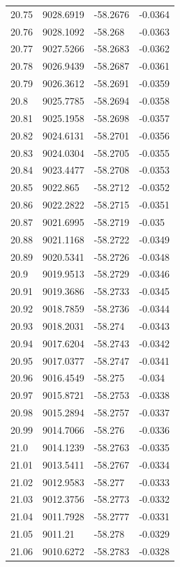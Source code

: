 \begin{table}[H]
\begin{tabular}{llll}
20.75 & 9028.6919 & -58.2676 & -0.0364 \\
20.76 & 9028.1092 & -58.268 & -0.0363 \\
20.77 & 9027.5266 & -58.2683 & -0.0362 \\
20.78 & 9026.9439 & -58.2687 & -0.0361 \\
20.79 & 9026.3612 & -58.2691 & -0.0359 \\
20.8 & 9025.7785 & -58.2694 & -0.0358 \\
20.81 & 9025.1958 & -58.2698 & -0.0357 \\
20.82 & 9024.6131 & -58.2701 & -0.0356 \\
20.83 & 9024.0304 & -58.2705 & -0.0355 \\
20.84 & 9023.4477 & -58.2708 & -0.0353 \\
20.85 & 9022.865 & -58.2712 & -0.0352 \\
20.86 & 9022.2822 & -58.2715 & -0.0351 \\
20.87 & 9021.6995 & -58.2719 & -0.035 \\
20.88 & 9021.1168 & -58.2722 & -0.0349 \\
20.89 & 9020.5341 & -58.2726 & -0.0348 \\
20.9 & 9019.9513 & -58.2729 & -0.0346 \\
20.91 & 9019.3686 & -58.2733 & -0.0345 \\
20.92 & 9018.7859 & -58.2736 & -0.0344 \\
20.93 & 9018.2031 & -58.274 & -0.0343 \\
20.94 & 9017.6204 & -58.2743 & -0.0342 \\
20.95 & 9017.0377 & -58.2747 & -0.0341 \\
20.96 & 9016.4549 & -58.275 & -0.034 \\
20.97 & 9015.8721 & -58.2753 & -0.0338 \\
20.98 & 9015.2894 & -58.2757 & -0.0337 \\
20.99 & 9014.7066 & -58.276 & -0.0336 \\
21.0 & 9014.1239 & -58.2763 & -0.0335 \\
21.01 & 9013.5411 & -58.2767 & -0.0334 \\
21.02 & 9012.9583 & -58.277 & -0.0333 \\
21.03 & 9012.3756 & -58.2773 & -0.0332 \\
21.04 & 9011.7928 & -58.2777 & -0.0331 \\
21.05 & 9011.21 & -58.278 & -0.0329 \\
21.06 & 9010.6272 & -58.2783 & -0.0328 \\

\end{tabular}
\end{table}
